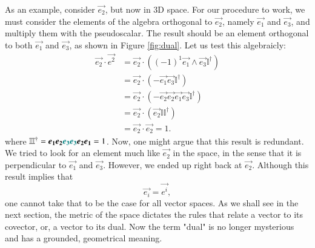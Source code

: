 As an example, consider $\vec{e_2}$, but now in 3D space. For our procedure to work, we must consider the elements of the algebra orthogonal to $\vec{e_2}$, namely $\vec{e_1}$ and $\vec{e_3}$, and multiply them with the pseudoscalar. The result should be an element orthogonal to both $\vec{e_1}$ and $\vec{e_3}$, as shown in Figure \ref{fig:dual}. Let us test this algebraicly:
\begin{align*}
    \vec{e_2} \cdot \vec{e^2} &= \vec{e_2} \cdot ((-1)^1 \vec{e_1} \wedge \vec{e_3} \mathbb{I}^\dagger ) \\
                    &= \vec{e_2} \cdot (-\vec{e_1} \vec{e_3} \mathbb{I}^\dagger )\\
                    &= \vec{e_2} \cdot (-\vec{e_2} \vec{e_2} \vec{e_1} \vec{e_3} \mathbb{I}^\dagger )\\
                    &= \vec{e_2} \cdot (\vec{e_2} \mathbb{I} \mathbb{I}^\dagger)\\
                    &= \vec{e_2} \cdot \vec{e_2} = 1.
\end{align*}
where $\mathbb{I} \mathbb{I}^\dagger = \vec{e_1} \vec{e_2} \color{teal} \vec{e_3} \vec{e_3} \color{black} \vec{e_2} \vec{e_1} = 1$. Now, one might argue that this result is redundant. We tried to look for an element much like $\vec{e_2}$ in the space, in the sense that it is perpendicular to $\vec{e_1}$ and $\vec{e_3}$. However, we ended up right back at $\vec{e_2}$. Although this result implies that 
\begin{equation*}
    \vec{e_i} = \vec{e^i},
\end{equation*} 
one cannot take that to be the case for all vector spaces. As we shall see in the next section, the metric of the space dictates the rules that relate a vector to its covector, or, a vector to its dual. Now the term "dual" is no longer mysterious and has a grounded, geometrical meaning.
